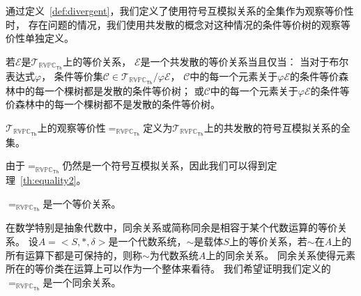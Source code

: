 通过定义~\ref{def:divergent}，我们定义了使用符号互模拟关系的全集作为观察等价性时，
存在问题的情况，我们使用共发散的概念对这种情况的条件等价树的观察等价性单独定义。

\begin{definition}[共发散]
   若$\mathcal{E}$是$\mathcal{T}_{\mathbb{RVPC}_{\mathsf{Th}}}$上的等价关系，
   $\mathcal{E}$是一个共发散的等价关系当且仅当：
   当对于布尔表达式$\varphi$，
   条件等价集$\mathcal{C}\in\mathcal{T}_{\mathbb{RVPC}_{\mathsf{Th}}}/\varphi\mathcal{E}$，
   $\mathcal{C}$中的每一个元素关于$\varphi\mathcal{E}$的条件等价森林中的每一个棵树都是发散的条件等价树；
   或$\mathcal{C}$中的每一个元素关于$\varphi\mathcal{E}$的条件等价森林中的每一个棵树都不是发散的条件等价树。
\end{definition}

\begin{definition}
   $\mathcal{T}_{\mathbb{RVPC}_{\mathsf{Th}}}$上的观察等价性$=_{\mathbb{RVPC}_{\mathsf{Th}}}$定义为$\mathcal{T}_{\mathbb{RVPC}_{\mathsf{Th}}}$上的共发散的符号互模拟关系的全集。
\end{definition}
由于$=_{\mathbb{RVPC}_{\mathsf{Th}}}$仍然是一个符号互模拟关系，因此我们可以得到定理~\ref{th:equality2}。
\begin{theorem}\label{th:equality2}
   $=_{\mathbb{RVPC}_{\mathsf{Th}}}$是一个等价关系。
\end{theorem}

在数学特别是抽象代数中，同余关系或简称同余是相容于某个代数运算的等价关系。
设$A=<S,*,\delta>$是一个代数系统，$\sim$是载体$S$上的等价关系，若$\sim$在$A$上的所有运算下都是可保持的，则称$\sim$为代数系统$A$上的同余关系\cite{Cougruence}。 
同余关系使得元素所在的等价类在运算上可以作为一个整体来看待。
我们希望证明我们定义的$=_{\mathbb{RVPC}_{\mathsf{Th}}}$是一个同余关系。

